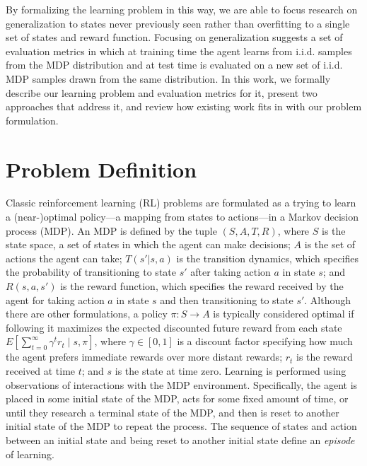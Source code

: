 By formalizing the learning problem in this way, we are able to focus research on generalization to states never previously seen rather than overfitting to a single set of states and reward function. Focusing on generalization suggests a set of evaluation metrics in which at training time the agent learns from i.i.d. samples from the MDP distribution and at test time is evaluated on a new set of i.i.d. MDP samples drawn from the same distribution.  In this work, we formally describe our learning problem and evaluation metrics for it, present two approaches that address it, and review how existing work fits in with our problem formulation.


\section{Problem Definition}
Classic reinforcement learning (RL) problems are formulated as a trying to learn a (near-)optimal policy---a mapping from states to actions---in a Markov decision process (MDP). An MDP is defined by the tuple $(S, A, T, R)$, where $S$ is the state space, a set of states in which the agent can make decisions; $A$ is the set of actions the agent can take; $T(s' | s, a)$ is the transition dynamics, which specifies the probability of transitioning to state $s'$ after taking action $a$ in state $s$; and $R(s, a, s')$ is the reward function, which specifies the reward received by the agent for taking action $a$ in state $s$ and then transitioning to state $s'$. Although there are other formulations, a policy $\pi : S \rightarrow A$ is typically considered optimal if following it maximizes the expected discounted future reward from each state $E \left[ \sum_{t=0}^{\infty} \gamma^t r_t \mid s, \pi \right]$, where $\gamma \in [0, 1]$ is a discount factor specifying how much the agent prefers immediate rewards over more distant rewards; $r_t$ is the reward received at time $t$; and $s$ is the state at time zero. Learning is performed using observations of interactions with the MDP environment. Specifically, the agent is placed in some initial state of the MDP, acts for some fixed amount of time, or until they research a terminal state of the MDP, and then is reset to another initial state of the MDP to repeat the process. The sequence of states and action between an initial state and being reset to another initial state define an {\em episode} of learning.

